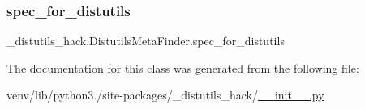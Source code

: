 \subsubsection{\texorpdfstring{spec\+\_\+for\+\_\+distutils}{spec\_for\_distutils}}
{\footnotesize\ttfamily \+\_\+distutils\+\_\+hack.\+Distutils\+Meta\+Finder.\+spec\+\_\+for\+\_\+distutils}



The documentation for this class was generated from the following file\+:\begin{DoxyCompactItemize}
\item 
venv/lib/python3./site-\/packages/\+\_\+distutils\+\_\+hack/\hyperlink{venv_2lib_2python3_89_2site-packages_2__distutils__hack_2____init_____8py}{\+\_\+\+\_\+init\+\_\+\+\_\+.\+py}\end{DoxyCompactItemize}
